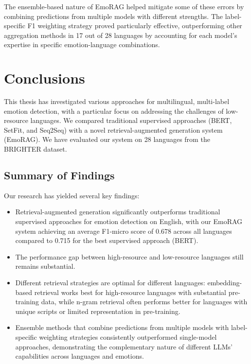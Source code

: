 \documentclass[a4paper,12pt]{extarticle}
\begin{document}
The ensemble-based nature of EmoRAG helped mitigate some of these errors by combining predictions from multiple models with different strengths. The label-specific F1 weighting strategy proved particularly effective, outperforming other aggregation methods in 17 out of 28 languages by accounting for each model's expertise in specific emotion-language combinations.

\section{Conclusions}

This thesis has investigated various approaches for multilingual, multi-label emotion detection, with a particular focus on addressing the challenges of low-resource languages. We compared traditional supervised approaches (BERT, SetFit, and Seq2Seq) with a novel retrieval-augmented generation system (EmoRAG). We have evaluated our system on 28 languages from the BRIGHTER dataset.

\subsection{Summary of Findings}

Our research has yielded several key findings:

\begin{itemize}
    \item Retrieval-augmented generation significantly outperforms traditional supervised approaches for emotion detection on English, with our EmoRAG system achieving an average F1-micro score of 0.678 across all languages compared to 0.715 for the best supervised approach (BERT).
    
    \item The performance gap between high-resource and low-resource languages still remains substantial.
    
    \item Different retrieval strategies are optimal for different languages: embedding-based retrieval works best for high-resource languages with substantial pre-training data, while n-gram retrieval often performs better for languages with unique scripts or limited representation in pre-training.
    
    \item Ensemble methods that combine predictions from multiple models with label-specific weighting strategies consistently outperformed single-model approaches, demonstrating the complementary nature of different LLMs' capabilities across languages and emotions.
    
\end{itemize}
\end{document}
